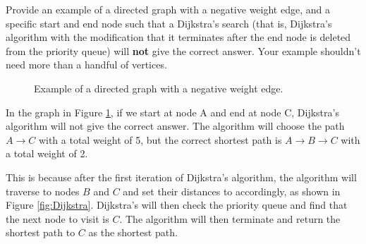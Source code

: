 \documentclass[12pt]{exam}
\newcommand{\stars}[1]{%
    \foreach \n in {1,...,#1}{%
        $\filledstar$%
    }%
}
\begin{document}
\begin{questions}
\begin{parts}
    \end{parts}

    \clearpage

    \question[15] [W6, \stars{2}] Provide an example of a directed graph with a negative weight edge, and a specific start and end node such that a Dijkstra's search (that is, Dijkstra's algorithm with the modification that it terminates after the end node is deleted from the priority queue) will \textbf{not} give the correct answer. Your example shouldn't need more than a handful of vertices.

    \begin{figure}[H]
        \centering
        \caption{Example of a directed graph with a negative weight edge.}
        \label{fig:graph1}
    \end{figure}

    In the graph in Figure \ref{fig:graph1}, if we start at node A and end at node C, Dijkstra's algorithm will not give the correct answer. The algorithm will choose the path $A \rightarrow C$ with a total weight of 5, but the correct shortest path is $A \rightarrow B \rightarrow C$ with a total weight of 2.

    This is because after the first iteration of Dijkstra's algorithm, the algorithm will traverse to nodes $B$ and $C$ and set their distances to accordingly, as shown in Figure \ref{fig:Dijkstra}. Dijkstra's will then check the priority queue and find that the next node to visit is $C$. The algorithm will then terminate and return the shortest path to $C$ as the shortest path.

    \begin{figure}[H]
        \centering
\end{figure}
\end{questions}
\end{document}
